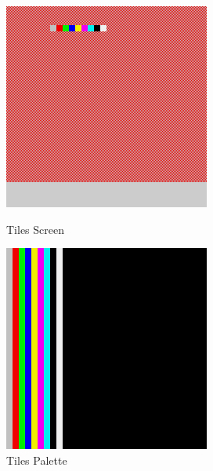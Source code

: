 \documentclass{article}
\begin{document}
\begin{figure}[H]
    \centering
    \begin{minipage}[H]{0.45\linewidth}
        \centering
        \includegraphics[width=\textwidth]{../images/tiles_screen.png}
        \caption{Tiles Screen}
        \label{fig:tiles_screen}
    \end{minipage}
    \hfill
    \begin{minipage}[H]{0.45\linewidth}
        \centering
        \includegraphics[width=\textwidth]{../images/tiles_palette.png}
        \caption{Tiles Palette}
        \label{fig:tile_palette}
    \end{minipage}
\end{figure}
\end{document}
